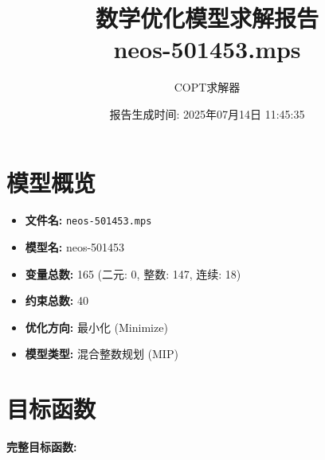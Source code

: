\documentclass[a4paper,10pt]{article}
\title{数学优化模型求解报告\\{\large neos-501453.mps}}
\author{COPT求解器}
\date{报告生成时间: 2025年07月14日 11:45:35}
\begin{document}
\maketitle
\tableofcontents
\newpage

\section{模型概览}
\begin{itemize}
    \item \textbf{文件名:} \texttt{neos-501453.mps}
    \item \textbf{模型名:} neos-501453
    \item \textbf{变量总数:} 165 (二元: 0, 整数: 147, 连续: 18)
    \item \textbf{约束总数:} 40
    \item \textbf{优化方向:} 最小化 (Minimize)
    \item \textbf{模型类型:} 混合整数规划 (MIP)
\end{itemize}
\section{目标函数}

\textbf{完整目标函数:}
\end{document}

